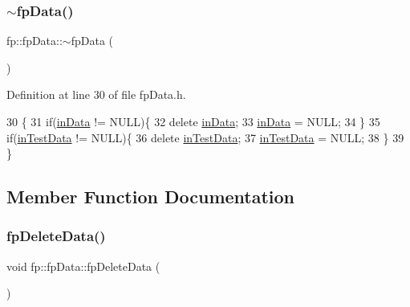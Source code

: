 \subsubsection{\texorpdfstring{$\sim$fp\+Data()}{~fpData()}}
{\footnotesize\ttfamily fp\+::fp\+Data\+::$\sim$fp\+Data (\begin{DoxyParamCaption}{ }\end{DoxyParamCaption})\hspace{0.3cm}{\ttfamily [inline]}}



Definition at line 30 of file fp\+Data.\+h.


\begin{DoxyCode}
30                      \{
31                 \textcolor{keywordflow}{if}(\hyperlink{classfp_1_1fpData_a49d7c3f58bcf88843c25b1b0c9714ebe}{inData} != NULL)\{
32                     \textcolor{keyword}{delete} \hyperlink{classfp_1_1fpData_a49d7c3f58bcf88843c25b1b0c9714ebe}{inData};
33                     \hyperlink{classfp_1_1fpData_a49d7c3f58bcf88843c25b1b0c9714ebe}{inData} = NULL;
34                 \}
35                 \textcolor{keywordflow}{if}(\hyperlink{classfp_1_1fpData_ad4f4dd3a8d15633b7f983932fa60bbad}{inTestData} != NULL)\{
36                     \textcolor{keyword}{delete} \hyperlink{classfp_1_1fpData_ad4f4dd3a8d15633b7f983932fa60bbad}{inTestData};
37                     \hyperlink{classfp_1_1fpData_ad4f4dd3a8d15633b7f983932fa60bbad}{inTestData} = NULL;
38                 \}
39             \}
\end{DoxyCode}


\subsection{Member Function Documentation}
\mbox{\label{classfp_1_1fpData_a44df119acad6c339966d67f2c634a369}} 
\subsubsection{\texorpdfstring{fp\+Delete\+Data()}{fpDeleteData()}}
{\footnotesize\ttfamily void fp\+::fp\+Data\+::fp\+Delete\+Data (\begin{DoxyParamCaption}{ }\end{DoxyParamCaption})\hspace{0.3cm}{\ttfamily [inline]}}



